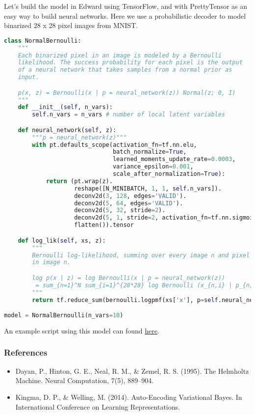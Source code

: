 Let's build the model in Edward using TensorFlow, and with
PrettyTensor as an easy way to build neural networks. Here we use a
probabilistic decoder to model binarized 28 x 28
pixel images from MNIST.
\begin{lstlisting}[language=Python]
class NormalBernoulli:
    """
    Each binarized pixel in an image is modeled by a Bernoulli
    likelihood. The success probability for each pixel is the output
    of a neural network that takes samples from a normal prior as
    input.

    p(x, z) = Bernoulli(x | p = neural_network(z)) Normal(z; 0, I)
    """
    def __init__(self, n_vars):
        self.n_vars = n_vars # number of local latent variables

    def neural_network(self, z):
        """p = neural_network(z)"""
        with pt.defaults_scope(activation_fn=tf.nn.elu,
                               batch_normalize=True,
                               learned_moments_update_rate=0.0003,
                               variance_epsilon=0.001,
                               scale_after_normalization=True):
            return (pt.wrap(z).
                    reshape([N_MINIBATCH, 1, 1, self.n_vars]).
                    deconv2d(3, 128, edges='VALID').
                    deconv2d(5, 64, edges='VALID').
                    deconv2d(5, 32, stride=2).
                    deconv2d(5, 1, stride=2, activation_fn=tf.nn.sigmoid).
                    flatten()).tensor

    def log_lik(self, xs, z):
        """
        Bernoulli log-likelihood, summing over every image n and pixel i
        in image n.

        log p(x | z) = log Bernoulli(x | p = neural_network(z))
         = sum_{n=1}^N sum_{i=1}^{28*28} log Bernoulli (x_{n,i} | p_{n,i})
        """
        return tf.reduce_sum(bernoulli.logpmf(xs['x'], p=self.neural_network(z)))

model = NormalBernoulli(n_vars=10)
\end{lstlisting}

An example script using this model can found
\href{https://github.com/blei-lab/edward/blob/master/examples/convolutional_vae.py}
{here}.

\subsubsection{References}\label{references}

\begin{itemize}
\item
  Dayan, P., Hinton, G. E., Neal, R. M., & Zemel, R. S. (1995). The Helmholtz Machine. Neural Computation, 7(5), 889–904.
\item
  Kingma, D. P., & Welling, M. (2014). Auto-Encoding Variational Bayes. In International Conference on Learning Representations.
\end{itemize}
